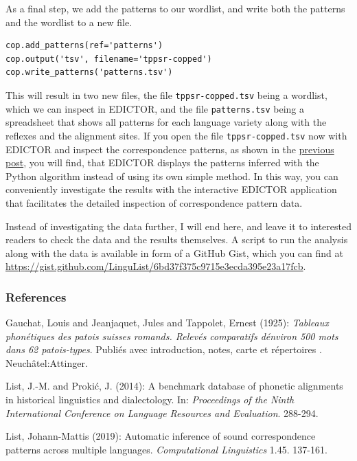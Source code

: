 \documentclass[
  a4paper,
  14pt,
  oneside,
  tablecaptionabove
]{scrbook}
\newcommand{\passthrough}[1]{#1}
\begin{document}
As a final step, we add the patterns to our wordlist, and write both the
patterns and the wordlist to a new file.

\begin{lstlisting}
cop.add_patterns(ref='patterns')
cop.output('tsv', filename='tppsr-copped')
cop.write_patterns('patterns.tsv')
\end{lstlisting}

This will result in two new files, the file
\passthrough{\lstinline!tppsr-copped.tsv!} being a wordlist, which we
can inspect in EDICTOR, and the file
\passthrough{\lstinline!patterns.tsv!} being a spreadsheet that shows
all patterns for each language variety along with the reflexes and the
alignment sites. If you open the file
\passthrough{\lstinline!tppsr-copped.tsv!} now with EDICTOR and inspect
the correspondence patterns, as shown in the
\href{https://calc.hypotheses.org/1807}{previous post}, you will find,
that EDICTOR displays the patterns inferred with the Python algorithm
instead of using its own simple method. In this way, you can
conveniently investigate the results with the interactive EDICTOR
application that facilitates the detailed inspection of correspondence
pattern data.

Instead of investigating the data further, I will end here, and leave it
to interested readers to check the data and the results themselves. A
script to run the analysis along with the data is available in form of a
GitHub Gist, which you can find at
\url{https://gist.github.com/LinguList/6bd37f375c9715e3ecda395e23a17fcb}.

\subsubsection*{References}

\nopagebreak\hangindent=0.7cm {\small  Gauchat, Louis and Jeanjaquet, Jules and Tappolet, Ernest (1925):
\emph{Tableaux phonétiques des patois suisses romands. Relevés comparatifs
dénviron 500 mots dans 62 patois-types}. Publiés avec introduction,
notes, carte et répertoires . Neuchâtel:Attinger.}

\nopagebreak\hangindent=0.7cm {\small  List, J.-M. and Prokić, J. (2014): A benchmark database of phonetic
alignments in historical linguistics and dialectology. In: \emph{Proceedings
of the Ninth International Conference on Language Resources and
Evaluation}. 288-294. }

\nopagebreak\hangindent=0.7cm {\small  List, Johann-Mattis (2019): Automatic inference of sound
correspondence patterns across multiple languages. \emph{Computational
Linguistics} 1.45. 137-161. }
\end{document}
